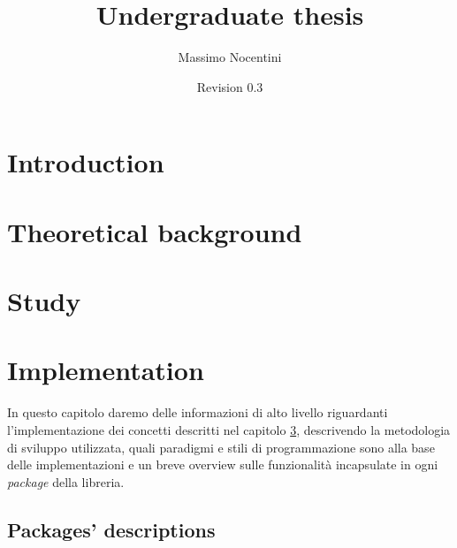 \documentclass[8pt, a4paper]{report}
\title{Undergraduate thesis}
\author{Massimo Nocentini}
\date{Revision 0.3}
\begin{document}
\lstset{
	language = java
	, numbers = left 
	, basicstyle=\sffamily%
	, tabsize=2
	, captionpos=b
	, breaklines=true
	, showspaces=false
	, showstringspaces=false
}

\maketitle

\tableofcontents

\newpage


\newpage


\newpage


\chapter{Introduction}



\chapter{Theoretical background}
\label{chapter:theoretical-background}


\chapter{Study}
\label{chapter:study}




\chapter{Implementation}

In questo capitolo daremo delle informazioni di alto livello
riguardanti l'implementazione dei concetti descritti nel capitolo
\ref{chapter:study}, descrivendo la metodologia di sviluppo
utilizzata, quali paradigmi e stili di programmazione sono alla base
delle implementazioni e un breve overview sulle funzionalit\`a
incapsulate in ogni \emph{package} della libreria.





\newpage
\section*{Packages' descriptions}
\end{document}
